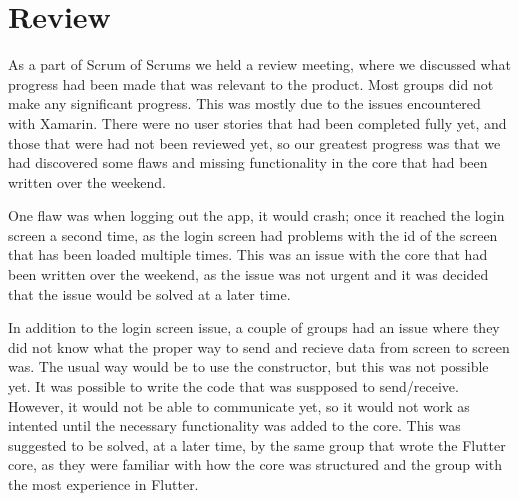 \section{Review}
As a part of Scrum of Scrums we held a review meeting, where we discussed what progress had been made that was relevant to the product.
Most groups did not make any significant progress.
This was mostly due to the issues encountered with Xamarin.
There were no user stories that had been completed fully yet, and those that were had not been reviewed yet, so our greatest progress was that we had discovered some flaws and missing functionality in the core that had been written over the weekend.

One flaw was when logging out the app, it would crash; once it reached the login screen a second time, as the login screen had problems with the id of the screen that has been loaded multiple times. 
This was an issue with the core that had been written over the weekend, as the issue was not urgent and it was decided that the issue would be solved at a later time.

In addition to the login screen issue, a couple of groups had an issue where they did not know what the proper way to send and recieve data from screen to screen was.
The usual way would be to use the constructor, but this was not possible yet. 
It was possible to write the code that was suspposed to send/receive. 
However, it would not be able to communicate yet, so it would not work as intented until the necessary functionality was added to the core.
This was suggested to be solved, at a later time, by the same group that wrote the Flutter core, as they were familiar with how the core was structured and the group with the most experience in Flutter.
